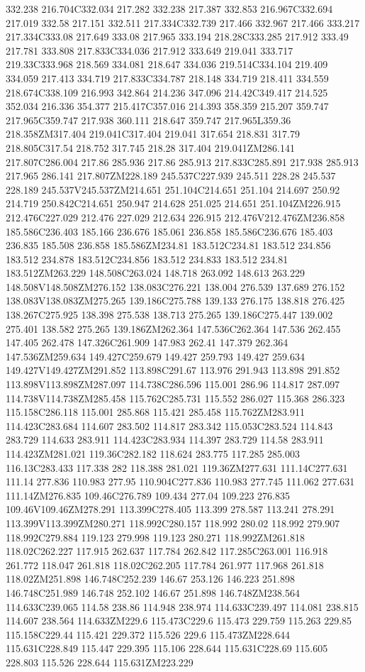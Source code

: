 332.238 216.704C332.034 217.282 332.238 217.387 332.853 216.967C332.694 217.019 332.58 217.151 332.511 217.334C332.739 217.466 332.967 217.466 333.217 217.334C333.08 217.649 333.08 217.965 333.194 218.28C333.285 217.912 333.49 217.781 333.808 217.833C334.036 217.912 333.649 219.041 333.717 219.33C333.968 218.569 334.081 218.647 334.036 219.514C334.104 219.409 334.059 217.413 334.719 217.833C334.787 218.148 334.719 218.411 334.559 218.674C338.109 216.993 342.864 214.236 347.096 214.42C349.417 214.525 352.034 216.336 354.377 215.417C357.016 214.393 358.359 215.207 359.747 217.965C359.747 217.938 360.111 218.647 359.747 217.965L359.36 218.358ZM317.404 219.041C317.404 219.041 317.654 218.831 317.79 218.805C317.54 218.752 317.745 218.28 317.404 219.041ZM286.141 217.807C286.004 217.86 285.936 217.86 285.913 217.833C285.891 217.938 285.913 217.965 286.141 217.807ZM228.189 245.537C227.939 245.511 228.28 245.537 228.189 245.537V245.537ZM214.651 251.104C214.651 251.104 214.697 250.92 214.719 250.842C214.651 250.947 214.628 251.025 214.651 251.104ZM226.915 212.476C227.029 212.476 227.029 212.634 226.915 212.476V212.476ZM236.858 185.586C236.403 185.166 236.676 185.061 236.858 185.586C236.676 185.403 236.835 185.508 236.858 185.586ZM234.81 183.512C234.81 183.512 234.856 183.512 234.878 183.512C234.856 183.512 234.833 183.512 234.81 183.512ZM263.229 148.508C263.024 148.718 263.092 148.613 263.229 148.508V148.508ZM276.152 138.083C276.221 138.004 276.539 137.689 276.152 138.083V138.083ZM275.265 139.186C275.788 139.133 276.175 138.818 276.425 138.267C275.925 138.398 275.538 138.713 275.265 139.186C275.447 139.002 275.401 138.582 275.265 139.186ZM262.364 147.536C262.364 147.536 262.455 147.405 262.478 147.326C261.909 147.983 262.41 147.379 262.364 147.536ZM259.634 149.427C259.679 149.427 259.793 149.427 259.634 149.427V149.427ZM291.852 113.898C291.67 113.976 291.943 113.898 291.852 113.898V113.898ZM287.097 114.738C286.596 115.001 286.96 114.817 287.097 114.738V114.738ZM285.458 115.762C285.731 115.552 286.027 115.368 286.323 115.158C286.118 115.001 285.868 115.421 285.458 115.762ZM283.911 114.423C283.684 114.607 283.502 114.817 283.342 115.053C283.524 114.843 283.729 114.633 283.911 114.423C283.934 114.397 283.729 114.58 283.911 114.423ZM281.021 119.36C282.182 118.624 283.775 117.285 285.003 116.13C283.433 117.338 282 118.388 281.021 119.36ZM277.631 111.14C277.631 111.14 277.836 110.983 277.95 110.904C277.836 110.983 277.745 111.062 277.631 111.14ZM276.835 109.46C276.789 109.434 277.04 109.223 276.835 109.46V109.46ZM278.291 113.399C278.405 113.399 278.587 113.241 278.291 113.399V113.399ZM280.271 118.992C280.157 118.992 280.02 118.992 279.907 118.992C279.884 119.123 279.998 119.123 280.271 118.992ZM261.818 118.02C262.227 117.915 262.637 117.784 262.842 117.285C263.001 116.918 261.772 118.047 261.818 118.02C262.205 117.784 261.977 117.968 261.818 118.02ZM251.898 146.748C252.239 146.67 253.126 146.223 251.898 146.748C251.989 146.748 252.102 146.67 251.898 146.748ZM238.564 114.633C239.065 114.58 238.86 114.948 238.974 114.633C239.497 114.081 238.815 114.607 238.564 114.633ZM229.6 115.473C229.6 115.473 229.759 115.263 229.85 115.158C229.44 115.421 229.372 115.526 229.6 115.473ZM228.644 115.631C228.849 115.447 229.395 115.106 228.644 115.631C228.69 115.605 228.803 115.526 228.644 115.631ZM223.229 